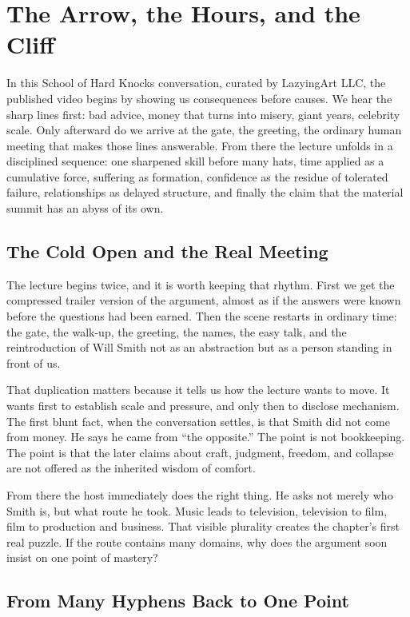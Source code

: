 \chapter{The Arrow, the Hours, and the Cliff}

In this School of Hard Knocks conversation, curated by LazyingArt LLC, the published video begins by showing us consequences before causes. We hear the sharp lines first: bad advice, money that turns into misery, giant years, celebrity scale. Only afterward do we arrive at the gate, the greeting, the ordinary human meeting that makes those lines answerable. From there the lecture unfolds in a disciplined sequence: one sharpened skill before many hats, time applied as a cumulative force, suffering as formation, confidence as the residue of tolerated failure, relationships as delayed structure, and finally the claim that the material summit has an abyss of its own.

\section{The Cold Open and the Real Meeting}

The lecture begins twice, and it is worth keeping that rhythm. First we get the compressed trailer version of the argument, almost as if the answers were known before the questions had been earned. Then the scene restarts in ordinary time: the gate, the walk-up, the greeting, the names, the easy talk, and the reintroduction of Will Smith not as an abstraction but as a person standing in front of us.

That duplication matters because it tells us how the lecture wants to move. It wants first to establish scale and pressure, and only then to disclose mechanism. The first blunt fact, when the conversation settles, is that Smith did not come from money. He says he came from ``the opposite.'' The point is not bookkeeping. The point is that the later claims about craft, judgment, freedom, and collapse are not offered as the inherited wisdom of comfort.

From there the host immediately does the right thing. He asks not merely who Smith is, but what route he took. Music leads to television, television to film, film to production and business. That visible plurality creates the chapter's first real puzzle. If the route contains many domains, why does the argument soon insist on one point of mastery?

\section{From Many Hyphens Back to One Point}

